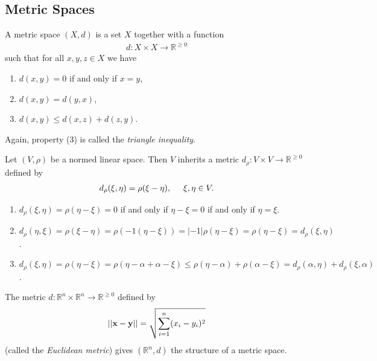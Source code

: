 \documentclass[12pt,letterpaper,reqno]{article}
\numberwithin{equation}{section}
\newcommand{\R}{\ensuremath{\mathbb R}}
\newcommand{\bx}{{\bf x}}
\newcommand{\by}{{\bf y}}
\begin{document}
{\subsection{Metric Spaces}
\begin{defn}
	A metric space $(X,d)$ is a set $X$ together with a function
	\begin{align*}
		d:X \times X \to \R^{\geq 0}
	\end{align*}
	such that for all $x,y,z \in X$ we have
	\begin{enumerate}
		\item $d(x,y)=0$ if and only if $x=y$,
		\item $d(x,y)=d(y,x)$,
		\item $d(x,y) \leq d(x,z)+d(z,y)$.
	\end{enumerate}
	Again, property (3) is called the \emph{triangle inequality}.
\end{defn}

\begin{prop}
	Let $(V,\rho)$ be a normed linear space. Then $V$ inherits a metric $d_\rho:V \times V \to \R^{\geq 0}$ defined by
	\begin{align*}
		d_\rho(\xi,\eta)=\rho(\xi-\eta), \hspace{0.5cm} \xi,\eta \in V.
	\end{align*}
	
\end{prop}

\begin{pf}
	\begin{enumerate}
		\item $d_\rho(\xi,\eta)=\rho(\eta-\xi)=0$ if and only if $\eta-\xi=0$ if and only if $\eta=\xi$.
		\item $d_\rho(\eta,\xi)=\rho(\xi-\eta)=\rho(-1(\eta-\xi))=|-1|\rho(\eta-\xi)=\rho(\eta-\xi)=d_\rho(\xi,\eta)$.
		\item $d_\rho(\xi,\eta)=\rho(\eta-\xi)=\rho(\eta-\alpha+\alpha-\xi) \leq \rho(\eta-\alpha)+\rho(\alpha-\xi)=d_\rho(\alpha,\eta)+d_\rho(\xi,\alpha)$.
	\end{enumerate}
\end{pf}

\begin{example}
The metric $d:\R^n \times \R^n \to \R^{\geq 0}$ defined by
\begin{align*}
	||\bx-\by||=\sqrt{\sum_{i=1}^n(x_i-y_i)^2}
\end{align*}
(called the \emph{Euclidean metric}) gives $(\R^n,d)$ the structure of a metric space.
\end{example}

}
\end{document}
